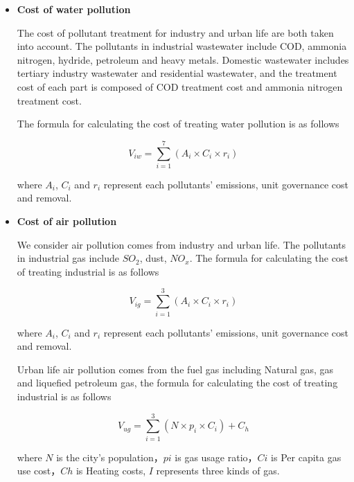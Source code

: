 \documentclass{mcmthesis}
\begin{document}
				\begin{itemize}
					
					\item \textbf{Cost of water pollution}
					
					The cost of pollutant treatment for industry and urban life are both taken into account. The pollutants in industrial wastewater include COD, ammonia nitrogen, hydride, petroleum and heavy metals. Domestic wastewater includes tertiary industry wastewater and residential wastewater, and the treatment cost of each part is composed of COD treatment cost and ammonia nitrogen treatment cost.
					
					The formula for calculating the cost of treating water pollution is as follows
					
					\begin{equation}
						V _ { i w } = \sum _ { i = 1 } ^ { 7 } \left( A _ { i } \times C _ { i } \times r _ { i } \right)
					\end{equation}
					
					where $A_i$, $C_i$ and $r_i$ represent each pollutants’ emissions, unit governance cost and removal.
					
					\item \textbf{Cost of air pollution}
					
					We consider air pollution comes from industry and urban life. The pollutants in industrial gas include $SO_2$, dust, $NO_x$. The formula for calculating the cost of treating industrial is as follows
					
					\begin{equation}
						V _ { i g } = \sum _ { i = 1 } ^ { 3 } \left( A _ { i } \times C _ { i } \times r _ { i } \right)
					\end{equation}
					
					where $A_i$, $C_i$ and $r_i$ represent each pollutants’ emissions, unit governance cost and removal.
					
					Urban life air pollution comes from the fuel gas including Natural gas, gas and liquefied petroleum gas, the formula for calculating the cost of treating industrial is as follows
					
					\begin{equation}
						V _ { u g } = \sum _ { i = 1 } ^ { 3 } \left( N \times p _ { i } \times C _ { i } \right) + C _ { h }
					\end{equation}
					
					where $N$ is the city’s population，$pi$ is gas usage ratio，$Ci$ is Per capita gas use cost，$Ch$ is Heating costs, $I$ represents three kinds of gas.
					

\end{itemize}
\end{document}
